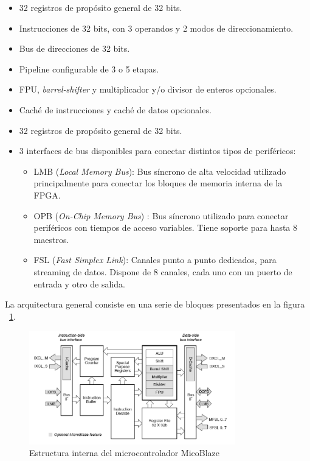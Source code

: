 	\begin{itemize}
	  \item  32 registros de propósito general de 32 bits.
	  \item  Instrucciones de 32 bits, con 3 operandos y 2 modos de direccionamiento.
	  \item  Bus de direcciones de 32 bits.
	  \item  Pipeline configurable de 3 o 5 etapas.
	  \item  FPU,\textit{ barrel-shifter} y multiplicador y/o divisor de enteros opcionales.
	  \item  Caché de instrucciones y caché de datos opcionales.
	  \item  32 registros de propósito general de 32 bits.
	  \item   3 interfaces de bus disponibles para conectar distintos tipos de periféricos:
		\begin{itemize}
		  \item  LMB \cite{Etiqueta23}(\textit{Local Memory Bus}): Bus síncrono de alta velocidad utilizado principalmente para conectar los bloques de memoria interna de la FPGA.
	 	 \item  OPB \cite{Etiqueta24}(\textit{On-Chip Memory Bus}) : Bus síncrono utilizado para conectar periféricos con tiempos de acceso variables. Tiene soporte para hasta 8 maestros.
	 	 \item FSL\cite{Etiqueta25} (\textit{Fast Simplex Link}): Canales punto a punto dedicados, para streaming de datos. Dispone de 8 canales, cada uno con un puerto de entrada y otro de salida.
		\end{itemize}
	\end{itemize}

La arquitectura general consiste en una serie de bloques presentados en la figura ~\ref{fig:MicoBlazer}.
		
	\begin{figure}[h!]
 	\begin{center}
  	\includegraphics[width=0.8\textwidth,keepaspectratio=true]{./images/estructuramicroblazer}
  	\caption{Estructura interna del microcontrolador MicoBlaze}
  	\label{fig:MicoBlazer}
 	\end{center}
	\end{figure}

